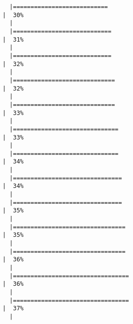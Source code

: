 \documentclass[12pt]{article}
\begin{document}
\begin{verbatim}
  |===========================                                                               |  30%
  |                                                                                                
  |============================                                                              |  31%
  |                                                                                                
  |============================                                                              |  32%
  |                                                                                                
  |=============================                                                             |  32%
  |                                                                                                
  |=============================                                                             |  33%
  |                                                                                                
  |==============================                                                            |  33%
  |                                                                                                
  |==============================                                                            |  34%
  |                                                                                                
  |===============================                                                           |  34%
  |                                                                                                
  |===============================                                                           |  35%
  |                                                                                                
  |================================                                                          |  35%
  |                                                                                                
  |================================                                                          |  36%
  |                                                                                                
  |=================================                                                         |  36%
  |                                                                                                
  |=================================                                                         |  37%
  |                                                                                                

\end{verbatim}
\end{document}
